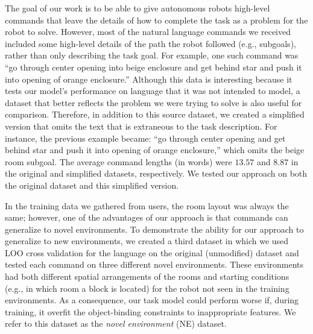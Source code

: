 \documentclass[conference]{IEEEtran}
\begin{document}
The goal of our work is to be able to give autonomous robots high-level commands that leave the details of how to complete the task as a problem for the robot to solve. However, most of the natural language commands we received included some high-level details of the path the robot followed (e.g., subgoals), rather than only describing the task goal. 
For example, one such command was ``go through center opening into beige enclosure and get behind star and push it into opening of orange enclosure.'' 
Although this data is interesting because it tests our model's performance on language that it was not intended to model, a dataset that better reflects the problem we were trying to solve is also useful for comparison. Therefore, in addition to this source dataset, we  created a simplified version that omits the text that is extraneous to the task description. 
For instance, the previous example became: ``go through center opening and get behind star and push it into opening of orange enclosure,'' which omits the beige room subgoal. 
The average command lengths (in words) were $13.57$ and $8.87$ in the original and simplified datasets, respectively. We tested our approach on both the original dataset and this simplified version.

In the training data we gathered from users, the room layout was always the same; however, one of the advantages of our approach is that commands can generalize to novel environments. To demonstrate the ability for our approach to generalize to new environments, we created a third dataset in which we used LOO cross validation for the language on the original (unmodified) dataset and tested each command on three different novel environments. These environments had both different spatial arrangements of the rooms and starting conditions (e.g., in which room a block is located) for the robot not seen in the training environments.
As a consequence, our task model could perform worse if, during training, it overfit the object-binding constraints to inappropriate features. We refer to this dataset as the {\em novel environment} (NE) dataset.
\end{document}
